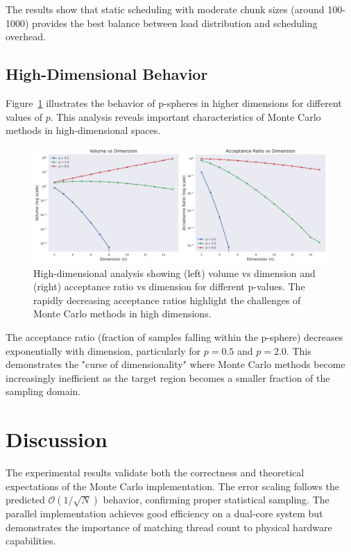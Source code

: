 \documentclass[11pt,a4paper]{article}
\begin{document}
	The results show that static scheduling with moderate chunk sizes (around 100-1000) provides the best balance between load distribution and scheduling overhead.
	
	\subsection{High-Dimensional Behavior}
	
	Figure~\ref{fig:high_dimensional} illustrates the behavior of p-spheres in higher dimensions for different values of $p$. This analysis reveals important characteristics of Monte Carlo methods in high-dimensional spaces.
	
	\begin{figure}[H]
		\centering
		\includegraphics[width=\linewidth]{../plots/high_dimensional_behavior.png}
		\caption{High-dimensional analysis showing (left) volume vs dimension and (right) acceptance ratio vs dimension for different p-values. The rapidly decreasing acceptance ratios highlight the challenges of Monte Carlo methods in high dimensions.}
		\label{fig:high_dimensional}
	\end{figure}
	
	The acceptance ratio (fraction of samples falling within the p-sphere) decreases exponentially with dimension, particularly for $p = 0.5$ and $p = 2.0$. This demonstrates the "curse of dimensionality" where Monte Carlo methods become increasingly inefficient as the target region becomes a smaller fraction of the sampling domain.
	
	\section{Discussion}
	
	The experimental results validate both the correctness and theoretical expectations of the Monte Carlo implementation. The error scaling follows the predicted $\mathcal{O}(1/\sqrt{N})$ behavior, confirming proper statistical sampling. The parallel implementation achieves good efficiency on a dual-core system but demonstrates the importance of matching thread count to physical hardware capabilities.
	
\end{document}
